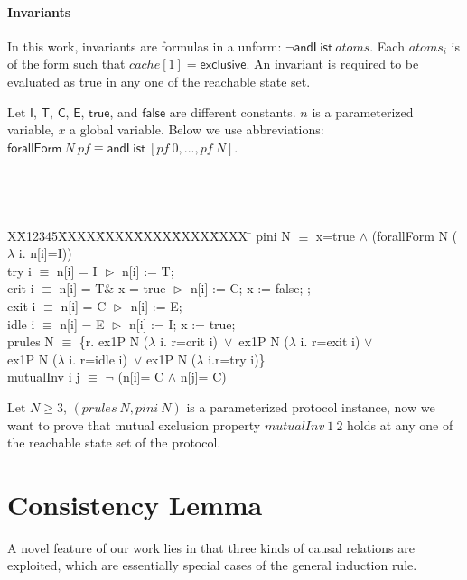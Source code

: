 \documentclass{llncs}
\newlength{\fminilength}
\newenvironment{fmini}[1][\linewidth]
  {\setlength{\fminilength}{#1\fboxsep-2\fboxrule}%
   \vspace{2ex}\noindent\begin{lrbox}{\fminibox}\begin{minipage}{\fminilength}%
   \mbox{ }\hfill\vspace{-2.5ex}}%
  {\end{minipage}\end{lrbox}\vspace{1ex}\hspace{0ex}%
   \framebox{\usebox{\fminibox}}}
\newenvironment{specification}
{\noindent\scriptsize
\tt\begin{fmini}\begin{tabbing}X\=X12345\=XXXX\=XXXX\=XXXX\=XXXX\=XXXX
\=\+\kill} {\end{tabbing}\normalfont\end{fmini}}
\begin{document}
\paragraph*{Invariants} In this work, invariants are formulas in a unform: $\neg\mathsf{andList}~atoms$.
Each $atoms_i$ is of the form such that
$cache[1]=\mathsf{exclusive}$. An invariant is required to be
evaluated as true in any one of the reachable state set.

Let $\mathsf{I}$, $\mathsf{T}$, $\mathsf{C}$,  $\mathsf{E}$,
$\mathsf{true}$, and $\mathsf{false}$ are different  constants. $n$
is a parameterized variable, $x$ a global variable. Below we use
abbreviations:
$\mathsf{forallForm}~N~pf\equiv\mathsf{andList}~[pf~0,...,pf~N]$.

\begin{specification}
 pini  N $\equiv$
   x=true $\wedge$ (forallForm N ($\lambda$ i. n[i]=I))\\

    try i $\equiv$ n[i] = I $\vartriangleright$ n[i] := T; \\

    crit i $\equiv$ n[i] = T\& x = true $\vartriangleright$  n[i] := C; x := false;  ;\\

%
   exit i $\equiv$ n[i] = C $\vartriangleright$ n[i] := E; \\


   idle  i $\equiv$  n[i] = E $\vartriangleright$ n[i] := I;  x := true;
  \\%
   prules N $\equiv$ \{r. ex1P N ($\lambda$ i. r=crit   i)~$\vee$~ex1P N ($\lambda$ i. r=exit
i)  $\vee$\\
 ex1P N ($\lambda$ i. r=idle i)~$\vee$ ex1P N ($\lambda$ i.r=try i)\}\\

mutualInv i j $\equiv$
  $\neg$ (n[i]= C $\wedge$ n[j]= C)\\



\end{specification}

Let $N \ge 3$, $(prules~N, pini~N)$ is a parameterized protocol
instance, now we want to prove that mutual exclusion property
$mutualInv~1~2$ holds at any one of the reachable state set of the
protocol.


\section{Consistency Lemma}
A novel feature of our work lies in that three kinds of causal
relations are exploited, which are essentially special cases of the
general induction rule.
\end{document}
